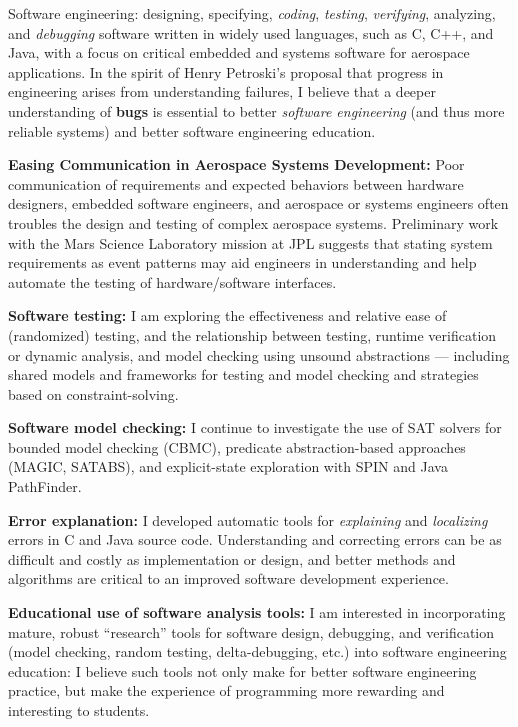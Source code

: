 \documentclass[ComputerScience]{vita}
\begin{document}
\begin{vita}
\begin{Research Interests}
\item Software engineering: designing, specifying, \emph{coding}, \emph{testing}, \emph{verifying}, analyzing, and \emph{debugging} software written in widely used languages, such as C, C++, and Java, with a focus on critical embedded and systems software for aerospace applications.  In the spirit of Henry Petroski's proposal that progress in engineering arises from understanding failures, I believe that a deeper understanding of {\bf bugs} is essential to better \emph{software engineering} (and thus more reliable systems) and better software engineering education.
\begin{Topics}
\item{\bf Easing Communication in Aerospace Systems Development:}  Poor communication of requirements and expected behaviors between hardware designers, embedded software engineers, and aerospace or systems engineers often troubles the design and testing of complex aerospace systems.  Preliminary work with the Mars Science Laboratory mission at JPL suggests that stating system requirements as event patterns may aid engineers in understanding and help automate the testing of hardware/software interfaces.
\item {\bf Software testing:} I am exploring the effectiveness and relative ease of (randomized) testing, and the relationship between testing, runtime verification or dynamic analysis, and model checking using unsound abstractions --- including shared models and frameworks for testing and model checking and strategies based on constraint-solving.
\item {\bf Software model checking:}  I continue to investigate the use of SAT solvers for bounded model checking (CBMC), predicate abstraction-based approaches (MAGIC, SATABS), and explicit-state exploration with SPIN and Java PathFinder. 
\item {\bf Error explanation:}   I developed automatic tools for \emph{explaining} and \emph{localizing} errors in C and Java source code.  Understanding and correcting errors can be as difficult and costly as implementation or design, and better methods and algorithms are critical to an improved software development experience.
\item{\bf Educational use of software analysis tools:}  I am interested in incorporating mature, robust ``research'' tools for software design, debugging, and verification (model checking, random testing, delta-debugging, etc.) into software engineering education:  I believe such tools not only make for better software engineering practice, but make the experience of programming more rewarding and interesting to students.
\end{Topics}
\end{Research Interests}



\end{vita}
\end{document}
